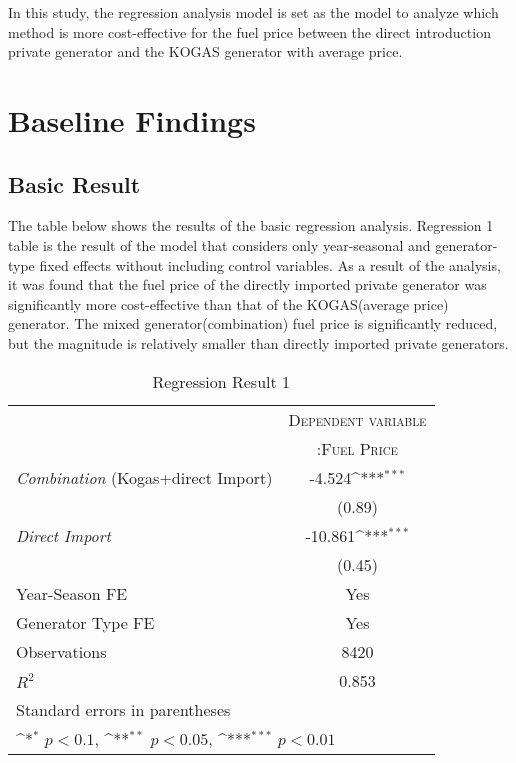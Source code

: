 \documentclass[leqno]{article}
\begin{document}
In this study, the regression analysis model is set as the model to analyze which method is more cost-effective for the fuel price between the direct introduction private generator and the KOGAS generator with average price.


\cite{bai1998estimating}
\cite{bai2003computation}
\cite{bai2003critical}


\section{Baseline Findings}

\subsection{Basic Result}
The table below shows the results of the basic regression analysis. Regression 1 table is the result of the model that considers only year-seasonal and generator-type fixed effects without including control variables. As a result of the analysis, it was found that the fuel price of the directly imported private generator was significantly more cost-effective than that of the KOGAS(average price) generator. The mixed generator(combination) fuel price is significantly reduced, but the magnitude is relatively smaller than directly imported private generators.


\begin{table}[htbp]\centering
\def\sym#1{\ifmmode^{#1}\else\(^{#1}\)\fi}
\caption{Regression Result 1\label{tab1}}
\begin{tabular}{l*{1}{c}}
\toprule
 & \multicolumn{1}{c}{\textsc{Dependent variable}} \\ 
                     &\multicolumn{1}{c}{\textsc{:Fuel Price}}\\
                     \addlinespace
\hline \hline
\addlinespace
\textit{Combination} \small{(Kogas+direct Import)}          &      -4.524\sym{***}\\
                    &      (0.89)         \\
\addlinespace
\textit{Direct Import}       &     -10.861\sym{***}\\
                    &      (0.45)         \\
\midrule
Year-Season FE        &    Yes \\  
Generator Type FE        &    Yes \\  
Observations                   &    8420         \\
$R^2$                  &       0.853         \\
\hline \hline
\multicolumn{2}{l}{\footnotesize Standard errors in parentheses}\\
\multicolumn{2}{l}{\footnotesize \sym{*} \(p<0.1\), \sym{**} \(p<0.05\), \sym{***} \(p<0.01\)}\\
\end{tabular}
\end{table}
\end{document}
